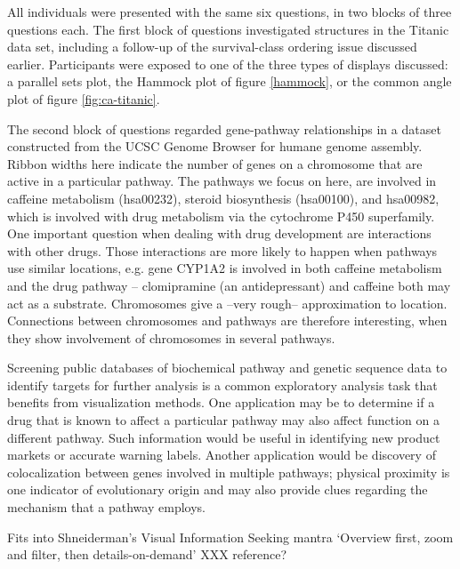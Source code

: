  All individuals were presented with the same six questions, in two blocks of three questions each. The first block of questions investigated structures in the Titanic data set, including a follow-up of the survival-class ordering issue discussed earlier. Participants were exposed to one of the three types of displays discussed: a parallel sets plot, the Hammock plot of figure \ref{hammock}, or the common angle plot of  figure \ref{fig:ca-titanic}.
 
The second block  of questions regarded gene-pathway relationships in a dataset constructed from the UCSC Genome Browser \cite{ucsc:2002} for humane genome assembly. Ribbon widths here indicate the number of genes on a  chromosome that are active in a particular pathway. The pathways we focus on here, are involved in caffeine metabolism (hsa00232),  steroid biosynthesis (hsa00100), and hsa00982, which is involved with drug metabolism via the cytochrome P450 superfamily.  One important question when dealing with drug development are interactions with other drugs. Those interactions are more likely to happen when pathways use similar locations, e.g. gene CYP1A2 is involved in both  caffeine metabolism and the drug pathway -- clomipramine (an antidepressant) and caffeine both may act as a substrate. Chromosomes give a --very rough-- approximation to location. Connections between chromosomes and pathways are therefore interesting, when they show involvement of chromosomes in several pathways.
 


Screening public databases of biochemical pathway and genetic sequence data to identify targets for further analysis is a common exploratory analysis task that benefits from visualization methods. One application may be to determine if a drug that is known to affect a particular pathway may also affect function on a different pathway. Such information would be useful in identifying new product markets or accurate warning labels. Another application would be discovery of colocalization between genes involved in multiple pathways; physical proximity is one indicator of evolutionary origin and may also provide clues regarding the mechanism that a pathway employs.
 
 Fits into Shneiderman's Visual Information Seeking mantra `Overview first, zoom and filter, then details-on-demand' XXX reference?
 
